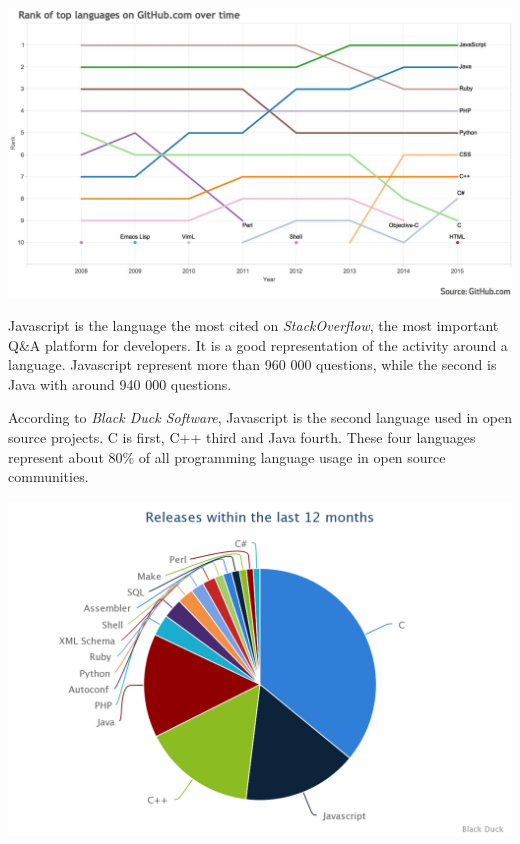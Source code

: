 \includegraphics[width=0.9\linewidth]{../../data/js-trends/github-ranks}


Javascript is the language the most cited on \textit{StackOverflow}, the most important Q\&A platform for developers.
It is a good representation of the activity around a language.
Javascript represent more than 960 000 questions, while the second is Java with around 940 000 questions.

According to \textit{Black Duck Software}, Javascript is the second language used in open source projects.
C is first, C++ third and Java fourth.
These four languages represent about 80\% of all programming language usage in open source communities.


\includegraphics[width=0.9\linewidth]{../../data/js-trends/black-duck-15}

